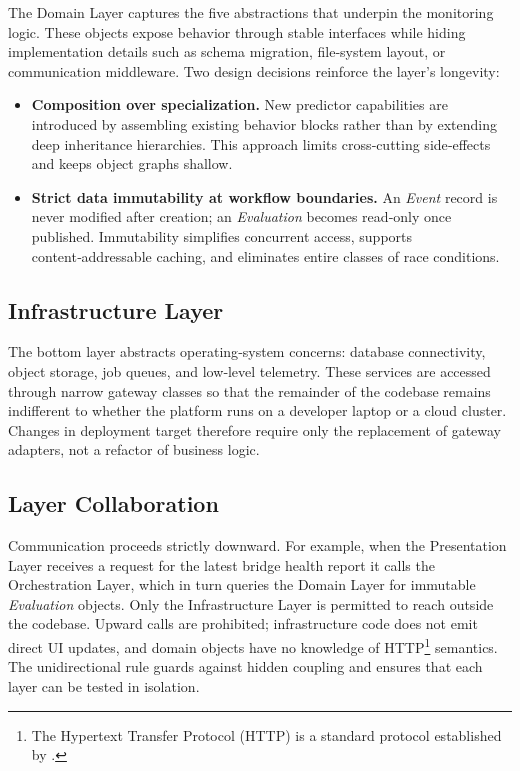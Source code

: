 The Domain Layer captures the five abstractions that underpin the
monitoring logic. These objects expose behavior through stable
interfaces while hiding implementation details such as schema migration,
file‑system layout, or communication middleware. 
Two design decisions reinforce the layer's longevity:

\begin{itemize}
\tightlist
\item
  \textbf{Composition over specialization.} New predictor capabilities
  are introduced by assembling existing behavior blocks rather than by
  extending deep inheritance hierarchies. This approach limits
  cross‑cutting side‑effects and keeps object graphs shallow.
\item
  \textbf{Strict data immutability at workflow boundaries.} An
  \emph{Event} record is never modified after creation; an
  \emph{Evaluation} becomes read‑only once published. Immutability
  simplifies concurrent access, supports content‑addressable caching,
  and eliminates entire classes of race conditions.
\end{itemize}

\subsection{Infrastructure Layer}\label{infrastructure-layer}

The bottom layer abstracts operating‑system concerns: database
connectivity, object storage, job queues, and low‑level telemetry. These
services are accessed through narrow gateway classes so that the
remainder of the codebase remains indifferent to whether the platform
runs on a developer laptop or a cloud cluster. Changes in deployment
target therefore require only the replacement of gateway adapters, not a
refactor of business logic.

\subsection{Layer Collaboration}\label{layer-collaboration}

Communication proceeds strictly downward. For example, when the
Presentation Layer receives a request for the latest bridge health
report it calls the Orchestration Layer, which in turn queries the
Domain Layer for immutable \emph{Evaluation} objects. 
Only the Infrastructure Layer is permitted to reach outside the codebase. 
Upward calls are prohibited; infrastructure code does not emit direct UI updates, and domain objects have no
knowledge of HTTP\footnote{The Hypertext Transfer Protocol (HTTP) is a standard protocol established by \cite{fielding2022http}.} semantics. 
The unidirectional rule guards against hidden coupling and ensures that each layer can be tested in isolation.

